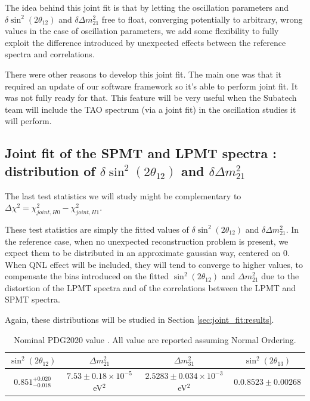 \documentclass[../main.tex]{subfiles}
\begin{document}
The idea behind this joint fit is that by letting the oscillation parameters and $\delta \sin^2(2\theta_{12})$ and $\delta \Delta m^2_{21}$ free to float, converging potentially to arbitrary, wrong values in the case of oscillation parameters, we add some flexibility to fully exploit the difference introduced by unexpected effects between the reference spectra and correlations.

There were other reasons to develop this joint fit. The main one was that it required an update of our software framework so it's able to perform joint fit. It was not fully ready for that. This feature will be very useful when the Subatech team will include the TAO spectrum (via a joint fit) in the oscillation studies it will perform.

\subsection{Joint fit of the SPMT and LPMT spectra : distribution of $\delta \sin^2(2\theta_{12})$ and $\delta \Delta m^2_{21}$}
\label{sec:joint_fit:delta_distrib}

The last test statistics we will study might be complementary to $ \Delta \chi^2 = \chi^2_{joint,H0} - \chi^2_{joint, H1} $.

These test statistics are simply the fitted values of $\delta \sin^2(2\theta_{12})$ and $\delta \Delta m^2_{21}$. In the reference case, when no unexpected reconstruction problem
is present, we expect them to be distributed in an approximate gaussian way, centered on 0. When QNL effect will be included, they will tend to converge to higher values, to compensate the bias introduced on the fitted $\sin^2(2\theta_{12})$ and $\Delta m^2_{21}$ due to the distortion of the LPMT spectra and of the correlations between the LPMT and SPMT spectra.

Again, these distributions will be studied in Section \ref{sec:joint_fit:results}.

\begin{table}
  \centering
  \begin{tabular}{c|c|c|c}
    $\sin^2(2\theta_{12})$    & $\Delta m^2_{21}$                       & $\Delta m^2_{31}$      & $\sin^2(2\theta_{13})$ \\
    \hline
    $0.851^{+0.020}_{-0.018}$ & $7.53 \pm 0.18 \times 10^{-5}$ eV$^2$   & $2.5283 \pm 0.034 \times 10^{-3}$ eV$^2$  & $0.0.8523 \pm 0.00268$
  \end{tabular}
  \caption{Nominal PDG2020 value \cite{particle_data_group_review_2020}. All value are reported assuming Normal Ordering.}
  \label{tab:joint_fit:pdg_value}
\end{table}
\end{document}
